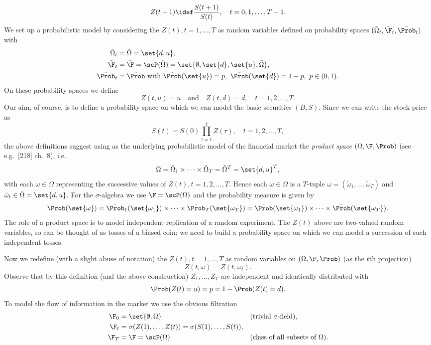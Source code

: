 \[
	Z(t+1) \idef \frac{S(t+1)}{S(t)}, \quad t = 0, 1, \dots, T-1.
\]
We set up a probabilistic model by considering the \(Z(t), t=1, \dots, T\) as random variables defined on probability spaces \((\tilde{\Omega}_t, \tilde{\F}_t, \tilde{\Prob}_t)\) with
\begin{align*}
	\tilde{\Omega}_t & = \tilde{\Omega} = \set{d, u},                                                                            \\
	\tilde{\F}_t     & = \tilde{\F} = \scP(\tilde{\Omega}) = \set{\emptyset, \set{d}, \set{u}, \tilde{\Omega}},                  \\
	\tilde{\Prob}_t  & = \tilde{\Prob} \text{ with } \tilde{\Prob}(\set{u}) = p, \ \tilde{\Prob}(\set{d}) = 1-p, \ p \in (0, 1).
\end{align*}
On these probability spaces we define
\[
	Z(t, u) = u \quad \text{and} \quad Z(t, d) = d, \quad t = 1, 2, \dots, T.
\]
Our aim, of course, is to define a probability space on which we can model the basic securities \((B, S)\). Since we can write the stock price as
\[
	S(t) = S(0) \prod_{\tau=1}^t Z(\tau), \quad t = 1, 2, \dots, T,
\]
the above definitions suggest using as the underlying probabilistic model of the financial market the \textit{product space} \((\Omega, \F, \Prob)\) (see e.g.\ [218] ch.\ 8), i.e.
\[
	\Omega = \tilde{\Omega}_1 \times \dots \times \tilde{\Omega}_T = \tilde{\Omega}^T = \set{d, u}^T,
\]
with each \(\omega \in \Omega\) representing the successive values of \(Z(t), t=1, 2, \dots, T\). Hence each \(\omega \in \Omega\) is a \(T\)-tuple \(\omega = (\tilde{\omega}_1, \dots, \tilde{\omega}_T)\) and \(\tilde{\omega}_t \in \tilde{\Omega} = \set{d, u}\). For the \(\sigma\)-algebra we use \(\F = \scP(\Omega)\) and the probability measure is given by
\[
	\Prob(\set{\omega}) = \tilde{\Prob}_1(\set{\omega_1}) \times \dots \times \tilde{\Prob}_T(\set{\omega_T}) = \tilde{\Prob}(\set{\omega_1}) \times \dots \times \tilde{\Prob}(\set{\omega_T}).
\]
The role of a product space is to model independent replication of a random experiment. The \(Z(t)\) above are two-valued random variables, so can be thought of as tosses of a biased coin; we need to build a probability space on which we can model a succession of such independent tosses.

Now we redefine (with a slight abuse of notation) the \(Z(t), t=1, \dots, T\) as random variables on \((\Omega, \F, \Prob)\) (as the \(t\)th projection)
\[
	Z(t, \omega) = Z(t, \omega_t).
\]
Observe that by this definition (and the above construction) \(Z_1, \dots, Z_T\) are independent and identically distributed with
\[
	\Prob(Z(t) = u) = p = 1 - \Prob(Z(t) = d).
\]
To model the flow of information in the market we use the obvious filtration
\begin{align*}
	\F_0 & = \set{\emptyset, \Omega}                                &  & \text{(trivial \(\sigma\)-field)},           \\
	\F_t & = \sigma(Z(1), \dots, Z(t)) = \sigma(S(1), \dots, S(t)), &  &                                            \\
	\F_T & = \F = \scP(\Omega)                                      &  & \text{(class of all subsets of \(\Omega\))}.
\end{align*}

